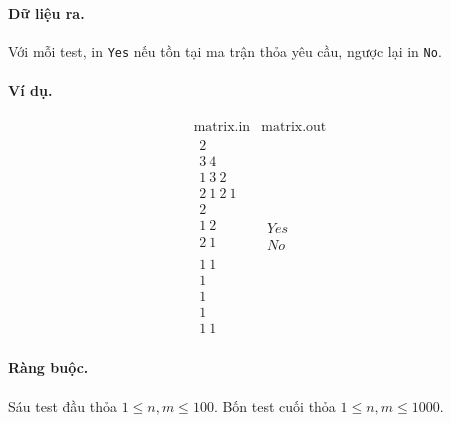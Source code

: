 \documentclass[11pt]{article}
\begin{document}
\paragraph{Dữ liệu ra.}
Với mỗi test, in \texttt{Yes} nếu tồn tại ma trận thỏa yêu cầu, ngược lại in
\texttt{No}.

\paragraph{Ví dụ.}
\[
\begin{array}{c|c}
\text{matrix.in} & \text{matrix.out}\\
\hline
\begin{array}{l}
2\\
3\ 4\\
1\ 3\ 2\\
2\ 1\ 2\ 1\\
2\\
1\ 2\\
2\ 1\\
\\
1\ 1\\
1\\
1\\
1\\
1\ 1
\end{array}
&
\begin{array}{l}
Yes\\
No
\end{array}
\end{array}
\]

\paragraph{Ràng buộc.}
Sáu test đầu thỏa \(1\le n,m\le 100\). Bốn test cuối thỏa
\(1\le n,m\le 1000\).
\end{document}
